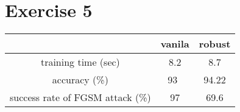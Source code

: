 
\section*{Exercise 5}

\begin{center}
\begin{tabular}{ |c|c|c| } 
 \hline
 & vanila & robust  \\ 
\hline
training time (sec) & 8.2 & 8.7 \\ 
accuracy (\%) & 93\ & 94.22 \\ 
success rate of FGSM attack (\%) & 97 & 69.6 \\ 
 \hline
\end{tabular}
\end{center}